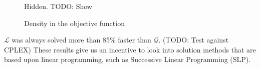 \begin{figure}[h!]
\begin{center}
    Hidden. TODO: Show
%    
\end{center}
\caption{Density in the objective function}
\label{fig:sparsobj}
\end{figure}

$\mathcal{L}$ was always solved more than 85\% faster than $\mathcal{Q}$.
(TODO: Test against CPLEX)
These results give us an incentive to look into solution methods that are based
upon linear programming, such as Successive Linear Programming (SLP).
